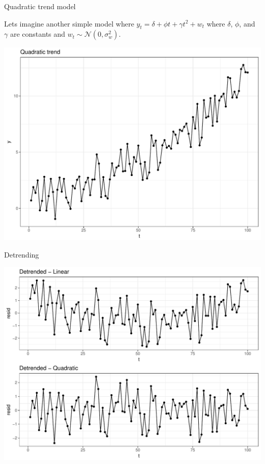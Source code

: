 \documentclass[11pt,ignorenonframetext,]{beamer}
\begin{document}
\begin{frame}{Quadratic trend model}

Lets imagine another simple model where
\(y_t = \delta + \phi t + \gamma t^2 + w_t\) where \(\delta\), \(\phi\),
and \(\gamma\) are constants and \(w_t \sim \mathcal{N}(0,\sigma^2_w)\).

\includegraphics{Lec7_files/figure-beamer/unnamed-chunk-16-1.pdf}

\end{frame}

\begin{frame}{Detrending}

\includegraphics{Lec7_files/figure-beamer/unnamed-chunk-17-1.pdf}

\end{frame}
\end{document}
